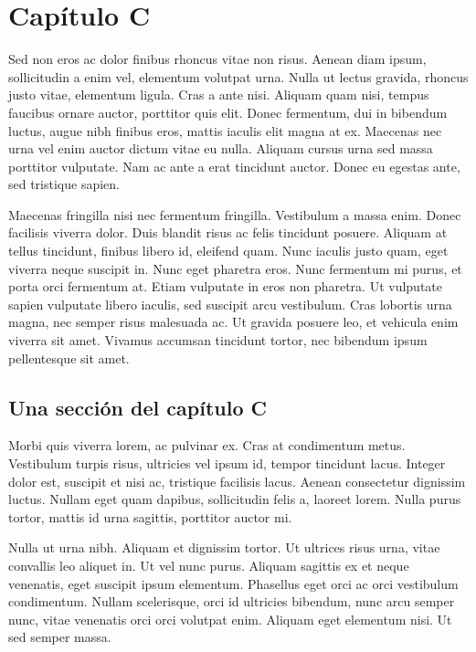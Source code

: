 \chapter{Cap\'itulo C}
\label{chap:C}

Sed non eros ac dolor finibus rhoncus vitae non risus. Aenean diam ipsum, sollicitudin a enim vel, elementum volutpat urna. Nulla ut lectus gravida, rhoncus justo vitae, elementum ligula. Cras a ante nisi. Aliquam quam nisi, tempus faucibus ornare auctor, porttitor quis elit. Donec fermentum, dui in bibendum luctus, augue nibh finibus eros, mattis iaculis elit magna at ex. Maecenas nec urna vel enim auctor dictum vitae eu nulla. Aliquam cursus urna sed massa porttitor vulputate. Nam ac ante a erat tincidunt auctor. Donec eu egestas ante, sed tristique sapien.

Maecenas fringilla nisi nec fermentum fringilla. Vestibulum a massa enim. Donec facilisis viverra dolor. Duis blandit risus ac felis tincidunt posuere. Aliquam at tellus tincidunt, finibus libero id, eleifend quam. Nunc iaculis justo quam, eget viverra neque suscipit in. Nunc eget pharetra eros. Nunc fermentum mi purus, et porta orci fermentum at. Etiam vulputate in eros non pharetra. Ut vulputate sapien vulputate libero iaculis, sed suscipit arcu vestibulum. Cras lobortis urna magna, nec semper risus malesuada ac. Ut gravida posuere leo, et vehicula enim viverra sit amet. Vivamus accumsan tincidunt tortor, nec bibendum ipsum pellentesque sit amet. 

\section{Una secci\'on del cap\'itulo C}

Morbi quis viverra lorem, ac pulvinar ex. Cras at condimentum metus. Vestibulum turpis risus, ultricies vel ipsum id, tempor tincidunt lacus. Integer dolor est, suscipit et nisi ac, tristique facilisis lacus. Aenean consectetur dignissim luctus. Nullam eget quam dapibus, sollicitudin felis a, laoreet lorem. Nulla purus tortor, mattis id urna sagittis, porttitor auctor mi.

Nulla ut urna nibh. Aliquam et dignissim tortor. Ut ultrices risus urna, vitae convallis leo aliquet in. Ut vel nunc purus. Aliquam sagittis ex et neque venenatis, eget suscipit ipsum elementum. Phasellus eget orci ac orci vestibulum condimentum. Nullam scelerisque, orci id ultricies bibendum, nunc arcu semper nunc, vitae venenatis orci orci volutpat enim. Aliquam eget elementum nisi. Ut sed semper massa.

